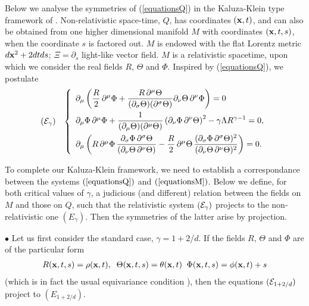 \documentclass[11pt,a4paper]{article}
\begin{document}
Below we analyse the symmetries of
(\ref{equationsQ}) in the Kaluza-Klein type framework of \cite{DGH}.
Non-relativistic
space-time, $Q$, has coordinates $({\bf x},t)$, and
can also be obtained from one higher dimensional manifold
$M$ with coordinates $({\bf x},t,s)$, when the coordinate $s$
 is factored out.
$M$ is endowed with the flat Lorentz
metric $d{\bf x}^2+2dtds$;
$\Xi=\partial_s$ light-like vector field.
$M$ is a relativistic spacetime, upon which we consider
the real fields $R$, $\Theta$ and $\Phi$. Inspired by (\ref{equationsQ}),
we postulate
\begin{eqnarray}
\begin{array}{ll}
\left({\cal E}_{\gamma}\right) &
\left\lbrace
\begin{array}{l}
\partial_\mu\left(\displaystyle{\frac{R}{2}}
\,\partial^\mu\Phi+\displaystyle
{\frac{R\,\partial^\mu\Theta}
{(\partial_\sigma\Theta)(\partial^\sigma\Theta)}}
\partial_\nu\Theta\,\partial^\nu\Phi\right)=0
\\[3,5mm]
\partial_\mu\Phi\,\partial^\mu\Phi
+\displaystyle{\frac{1}{(\partial_\mu\Theta)
(\partial^\mu\Theta)}}\left(\partial_\nu\Phi\,
\partial^\nu\Theta\right)^2-
\gamma\Lambda
R^{\gamma-1}=0,\\[3,5mm]
\partial_\mu\left(R\,\partial^\mu\Phi\,
\displaystyle{\frac{\partial_\sigma\Phi\,
\partial^\sigma\Theta}
{(\partial_\nu\Theta\,\partial^\nu\Theta)}}-\frac{R}{2}\,
\partial^\mu\Theta\,
\displaystyle{\frac{(\partial_\sigma\Phi\,\partial^\sigma
\Theta)^2}
{(\partial_\nu\Theta\,\partial^\nu\Theta)^2}}\right)=0.
\label{equationsM}
\end{array}
\right.
\end{array}
\end{eqnarray}

To complete our Kaluza-Klein framework, we need to establish a correspondance
between the systems $(\ref{equationsQ})$ and $(\ref{equationsM})$.
Below we define, for both critical values of $\gamma$, a judicious (and
different) relation between the fields on $M$ and those on $Q$, such
that the relativistic system $\displaystyle{({\cal E}_{\gamma})}$
projects to the non-relativistic one
$\displaystyle{({E}_{\gamma})}$. Then the
symmetries of the latter arise by projection.

$\bullet$ Let us first consider the standard case, $\gamma=1+2/d$.
If the fields $R$,
$\Theta$ and $\Phi$
are of the particular form
\begin{eqnarray}
R({\bf x},t,s)=
\rho({\bf x},t),\;\;
\Theta({\bf x},t,s)=\theta({\bf x},t)\;\;
\Phi({\bf x},t,s)=\phi({\bf x},t)+s
\label{equivarianceduval}
\end{eqnarray}
(which is in fact the usual equivariance condition \cite{DGH}),
then the equations $\displaystyle{({\cal
E}_{1+2/d})}$ project to
$\displaystyle{({E}_{1+2/d})}$.
\end{document}
